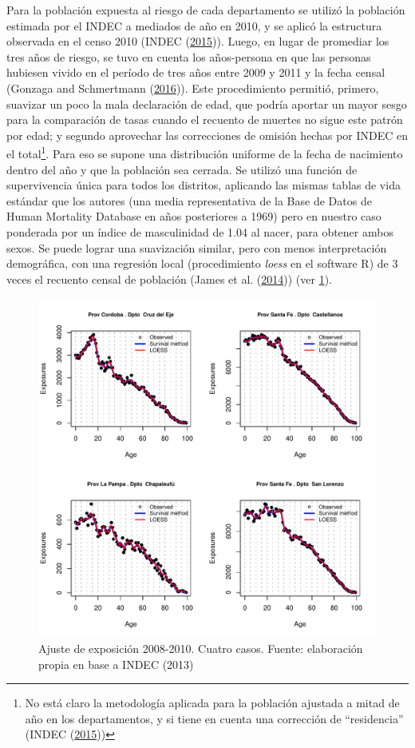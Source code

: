 \documentclass[12pt,]{article}
\begin{document}
Para la población expuesta al riesgo de cada departamento se utilizó la
población estimada por el INDEC a mediados de año en 2010, y se aplicó
la estructura observada en el censo 2010 (INDEC
(\protect\hyperlink{ref-INDEC2015}{2015})). Luego, en lugar de promediar
los tres años de riesgo, se tuvo en cuenta los años-persona en que las
personas hubiesen vivido en el período de tres años entre 2009 y 2011 y
la fecha censal (Gonzaga and Schmertmann
(\protect\hyperlink{ref-Gonzaga_Schmertmann_2016}{2016})). Este
procedimiento permitió, primero, suavizar un poco la mala declaración de
edad, que podría aportar un mayor sesgo para la comparación de tasas
cuando el recuento de muertes no sigue este patrón por edad; y segundo
aprovechar las correcciones de omisión hechas por INDEC en el
total\footnote{No está claro la metodología aplicada para la población
  ajustada a mitad de año en los departamentos, y si tiene en cuenta una
  corrección de ``residencia'' (INDEC
  (\protect\hyperlink{ref-INDEC2015}{2015}))}. Para eso se supone una
distribución uniforme de la fecha de nacimiento dentro del año y que la
población sea cerrada. Se utilizó una función de supervivencia única
para todos los distritos, aplicando las mismas tablas de vida estándar
que los autores (una media representativa de la Base de Datos de Human
Mortality Database en años posteriores a 1969) pero en nuestro caso
ponderada por un índice de masculinidad de 1.04 al nacer, para obtener
ambos sexos. Se puede lograr una suavización similar, pero con menos
interpretación demográfica, con una regresión local (procedimiento
\emph{loess} en el software R) de 3 veces el recuento censal de
población (James et al. (\protect\hyperlink{ref-James2014}{2014})) (ver
\ref{fig:AdjExp}).

\begin{figure}

{\centering \includegraphics[width=0.7\linewidth]{analysis/plots/AdjExp} 

}

\caption{Ajuste de exposición 2008-2010. Cuatro casos. Fuente: elaboración propia en base a INDEC (2013)}\label{fig:AdjExp}
\end{figure}
\end{document}
